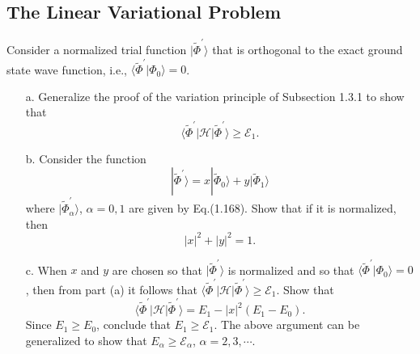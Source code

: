 \documentclass[a4paper]{book}
\begin{document}
	\subsection{The Linear Variational Problem}
	
	\begin{exercise}
	Consider a normalized trial function $|\tilde{\Phi}^\prime \rangle$ that is orthogonal to the exact ground state wave function, i.e., $\langle \tilde{\Phi}^\prime | \Phi_0 \rangle = 0$.
	\begin{enumerate}
	
	\item[a.] Generalize the proof of the variation principle of Subsection 1.3.1 to show that
	\[
		\langle \tilde{\Phi}^\prime | \mathscr{H} | \tilde{\Phi}^\prime \rangle \geq \mathscr{E}_1.
	\]	

	\item[b.] Consider the function
	\[
		| \tilde{\Phi}^\prime \rangle = x | \tilde{\Phi}_0 \rangle + y | \tilde{\Phi}_1 \rangle
	\]
	where $| \tilde{\Phi}^\prime_\alpha \rangle$, $\alpha = 0, 1$ are given by Eq.(1.168). Show that if it is normalized, then
	\[
		|x|^2 + |y|^2 = 1.
	\]
	
	\item[c.] When $x$ and $y$ are chosen so that $| \tilde{\Phi}^\prime \rangle$ is normalized and so that $\langle \tilde{\Phi}^\prime | \Phi_0 \rangle = 0$, then from part (a) it follows that $\langle \tilde{\Phi}^\prime | \mathscr{H} | \tilde{\Phi}^\prime \rangle \geq \mathscr{E}_1$. Show that
	\[
		\langle \tilde{\Phi}^\prime | \mathscr{H} | \tilde{\Phi}^\prime \rangle = E_1 - |x|^2 ( E_1 - E_0 ).
	\]
	Since $E_1 \geq E_0$, conclude that $E_1 \geq \mathscr{E}_1$. The above argument can be generalized to show that $E_\alpha \geq \mathscr{E}_\alpha$, $\alpha=2,3,\cdots$.
	
	\end{enumerate}
	\end{exercise}
	
\end{document}
